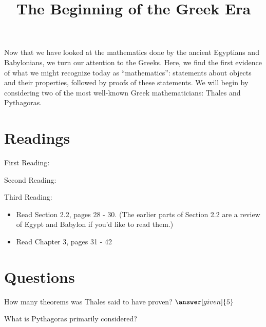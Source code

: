 \documentclass{ximera}
\title{The Beginning of the Greek Era}
\begin{document}
\begin{abstract}
\end{abstract}
\maketitle

Now that we have looked at the mathematics done by the ancient Egyptians and Babylonians, we turn our attention to the Greeks.  Here, we find the first evidence of what we might recognize today as ``mathematics'': statements about objects and their properties, followed by proofs of these statements.  We will begin by considering two of the most well-known Greek mathematicians: Thales and Pythagoras.




\section{Readings}

First Reading: 

Second Reading: 

Third Reading: 
\begin{itemize}
\item Read Section 2.2, pages 28 - 30. (The earlier parts of Section 2.2 are a review of Egypt and Babylon if you'd like to read them.)
\item Read Chapter 3, pages 31 - 42
\end{itemize}



\section{Questions}

\begin{question}
How many theorems was Thales said to have proven? $\answer[given]{5}$
\end{question}


\begin{question}
What is Pythagoras primarily considered?
\begin{multipleChoice}
\end{multipleChoice}
\end{question}





%
\end{document}
